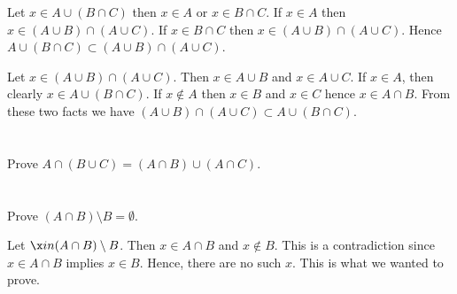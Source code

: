 \documentclass[a4paper]{article}
\begin{document}
Let $x \in A \cup (B \cap C)$ then $x \in A$ or $x \in B \cap C$. If $x \in A$ then $x \in (A \cup B) \cap (A \cup C)$. If $x \in B \cap C$ then $x \in (A \cup B) \cap (A \cup C)$. Hence $A \cup (B \cap C) \subset (A \cup B) \cap (A \cup C)$. 

\vspace{\baselineskip}

Let $x \in (A \cup B) \cap (A \cup C)$. Then $x \in A \cup B$ and $x \in A \cup C$. If $x \in A$, then clearly $x \in A \cup (B \cap C)$. If $x \not\in A$ then $x \in B$ and $x \in C$ hence $x \in A \cap B$. From these two facts we have  $(A \cup B) \cap (A \cup C) \subset A \cup (B \cap C)$.


\section{}

Prove $A \cap (B \cup C) = (A \cap B) \cup (A \cap C)$.


\section{}


\section{}


\section{}


\section{}


\section{}

Prove $(A \cap B) \setminus B = \emptyset$.

\vspace{\baselineskip}

Let $ \x in (A \cap B) \setminus B$. Then $x \in A \cap B$ and $x \not\in B$. This is a contradiction since $x \in A \cap B$ implies $x \in B$. Hence, there are no such $x$. This is what we wanted to prove.
\end{document}
